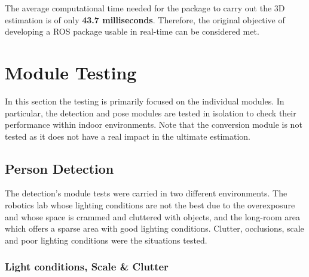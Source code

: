 The average computational time needed for the package to carry out the 3D estimation is of only \textbf{43.7 milliseconds}. Therefore, the original objective of developing a ROS package usable in real-time can be considered met.

\section{Module Testing}

In this section the testing is primarily focused on the individual modules. In particular, the detection and pose modules are tested in isolation to check their performance within indoor environments. Note that the conversion module is not tested as it does not have a real impact in the ultimate estimation.

\subsection{Person Detection}

The detection's module tests were carried in two different environments. The robotics lab whose lighting conditions are not the best due to the overexposure and whose space is crammed and cluttered with objects, and the long-room area which offers a sparse area with good lighting conditions. Clutter, occlusions, scale and poor lighting conditions were the situations tested.

\subsubsection{Light conditions, Scale \& Clutter}

